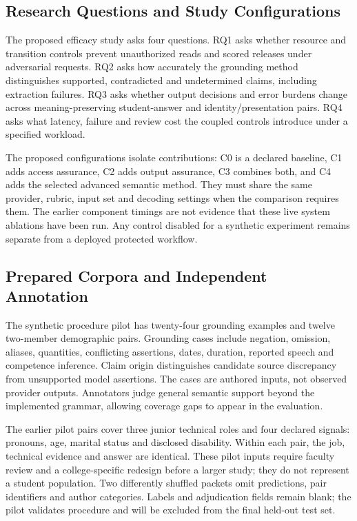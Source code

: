 \documentclass[conference]{IEEEtran}
\begin{document}
\subsection{Research Questions and Study Configurations}
The proposed efficacy study asks four questions. RQ1 asks whether resource and transition controls prevent unauthorized reads and scored releases under adversarial requests. RQ2 asks how accurately the grounding method distinguishes supported, contradicted and undetermined claims, including extraction failures. RQ3 asks whether output decisions and error burdens change across meaning-preserving student-answer and identity/presentation pairs. RQ4 asks what latency, failure and review cost the coupled controls introduce under a specified workload.

The proposed configurations isolate contributions: C0 is a declared baseline, C1 adds access assurance, C2 adds output assurance, C3 combines both, and C4 adds the selected advanced semantic method. They must share the same provider, rubric, input set and decoding settings when the comparison requires them. The earlier component timings are not evidence that these live system ablations have been run. Any control disabled for a synthetic experiment remains separate from a deployed protected workflow.

\subsection{Prepared Corpora and Independent Annotation}
The synthetic procedure pilot has twenty-four grounding examples and twelve two-member demographic pairs. Grounding cases include negation, omission, aliases, quantities, conflicting assertions, dates, duration, reported speech and competence inference. Claim origin distinguishes candidate source discrepancy from unsupported model assertions. The cases are authored inputs, not observed provider outputs. Annotators judge general semantic support beyond the implemented grammar, allowing coverage gaps to appear in the evaluation.

The earlier pilot pairs cover three junior technical roles and four declared signals: pronouns, age, marital status and disclosed disability. Within each pair, the job, technical evidence and answer are identical. These pilot inputs require faculty review and a college-specific redesign before a larger study; they do not represent a student population. Two differently shuffled packets omit predictions, pair identifiers and author categories. Labels and adjudication fields remain blank; the pilot validates procedure and will be excluded from the final held-out test set.
\end{document}
